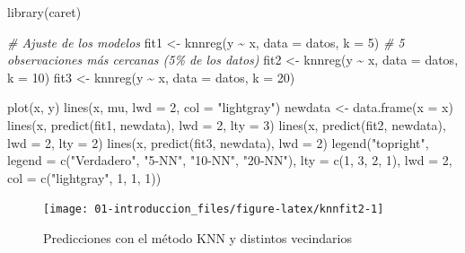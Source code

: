\documentclass[
  spanish,
]{book}
\newenvironment{Shaded}{\begin{snugshade}}{\end{snugshade}}
\newcommand{\AttributeTok}[1]{\textcolor[rgb]{0.77,0.63,0.00}{#1}}
\newcommand{\CommentTok}[1]{\textcolor[rgb]{0.56,0.35,0.01}{\textit{#1}}}
\newcommand{\DecValTok}[1]{\textcolor[rgb]{0.00,0.00,0.81}{#1}}
\newcommand{\FunctionTok}[1]{\textcolor[rgb]{0.00,0.00,0.00}{#1}}
\newcommand{\NormalTok}[1]{#1}
\newcommand{\OtherTok}[1]{\textcolor[rgb]{0.56,0.35,0.01}{#1}}
\newcommand{\SpecialCharTok}[1]{\textcolor[rgb]{0.00,0.00,0.00}{#1}}
\newcommand{\StringTok}[1]{\textcolor[rgb]{0.31,0.60,0.02}{#1}}
\theoremstyle{break}
\theoremstyle{definition}
\theoremstyle{definition}
\theoremstyle{definition}
\theoremstyle{definition}
\theoremstyle{remark}
\begin{document}
\begin{Shaded}
\begin{Highlighting}[]
\FunctionTok{library}\NormalTok{(caret)}

\CommentTok{\# Ajuste de los modelos}
\NormalTok{fit1 }\OtherTok{\textless{}{-}} \FunctionTok{knnreg}\NormalTok{(y }\SpecialCharTok{\textasciitilde{}}\NormalTok{ x, }\AttributeTok{data =}\NormalTok{ datos, }\AttributeTok{k =} \DecValTok{5}\NormalTok{) }\CommentTok{\# 5 observaciones más cercanas (5\% de los datos)}
\NormalTok{fit2 }\OtherTok{\textless{}{-}} \FunctionTok{knnreg}\NormalTok{(y }\SpecialCharTok{\textasciitilde{}}\NormalTok{ x, }\AttributeTok{data =}\NormalTok{ datos, }\AttributeTok{k =} \DecValTok{10}\NormalTok{)}
\NormalTok{fit3 }\OtherTok{\textless{}{-}} \FunctionTok{knnreg}\NormalTok{(y }\SpecialCharTok{\textasciitilde{}}\NormalTok{ x, }\AttributeTok{data =}\NormalTok{ datos, }\AttributeTok{k =} \DecValTok{20}\NormalTok{)}

\FunctionTok{plot}\NormalTok{(x, y) }
\FunctionTok{lines}\NormalTok{(x, mu, }\AttributeTok{lwd =} \DecValTok{2}\NormalTok{, }\AttributeTok{col =} \StringTok{"lightgray"}\NormalTok{)}
\NormalTok{newdata }\OtherTok{\textless{}{-}} \FunctionTok{data.frame}\NormalTok{(}\AttributeTok{x =}\NormalTok{ x)}
\FunctionTok{lines}\NormalTok{(x, }\FunctionTok{predict}\NormalTok{(fit1, newdata), }\AttributeTok{lwd =} \DecValTok{2}\NormalTok{, }\AttributeTok{lty =} \DecValTok{3}\NormalTok{)}
\FunctionTok{lines}\NormalTok{(x, }\FunctionTok{predict}\NormalTok{(fit2, newdata), }\AttributeTok{lwd =} \DecValTok{2}\NormalTok{, }\AttributeTok{lty =} \DecValTok{2}\NormalTok{)}
\FunctionTok{lines}\NormalTok{(x, }\FunctionTok{predict}\NormalTok{(fit3, newdata), }\AttributeTok{lwd =} \DecValTok{2}\NormalTok{)}
\FunctionTok{legend}\NormalTok{(}\StringTok{"topright"}\NormalTok{, }\AttributeTok{legend =} \FunctionTok{c}\NormalTok{(}\StringTok{"Verdadero"}\NormalTok{, }\StringTok{"5{-}NN"}\NormalTok{, }\StringTok{"10{-}NN"}\NormalTok{, }\StringTok{"20{-}NN"}\NormalTok{), }
       \AttributeTok{lty =} \FunctionTok{c}\NormalTok{(}\DecValTok{1}\NormalTok{, }\DecValTok{3}\NormalTok{, }\DecValTok{2}\NormalTok{, }\DecValTok{1}\NormalTok{), }\AttributeTok{lwd =} \DecValTok{2}\NormalTok{, }\AttributeTok{col =} \FunctionTok{c}\NormalTok{(}\StringTok{"lightgray"}\NormalTok{, }\DecValTok{1}\NormalTok{, }\DecValTok{1}\NormalTok{, }\DecValTok{1}\NormalTok{))}
\end{Highlighting}
\end{Shaded}

\begin{figure}[!htb]

{\centering \texttt{[image: 01-introduccion\_files/figure-latex/knnfit2-1]} 

}

\caption{Predicciones con el método KNN y distintos vecindarios}\label{fig:knnfit2}
\end{figure}
\end{document}
